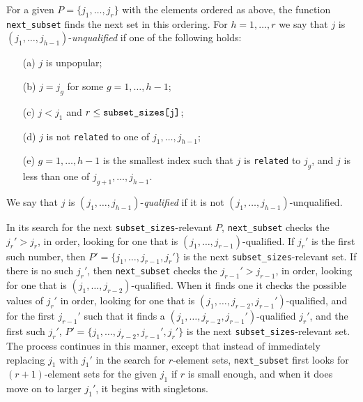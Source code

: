 \documentclass[12pt]{article}
\theoremstyle{definition}
\begin{document}
For a given $P = \{j_1, \ldots, j_r\}$ with the elements ordered as
above, the function \texttt{next\_subset} finds the next set in this
ordering.  For $h = 1, \ldots, r$ we say that $j$ is
$(j_1, \ldots, j_{h-1})$-\emph{unqualified} if one of the following holds:
\begin{enumerate}
  \item[(a)] $j$ is unpopular;
  \item[(b)] $j = j_g$ for some $g = 1, \ldots, h-1$;
  \item[(c)] $j < j_1$ and $r \le \text{\texttt{subset\_sizes[j]}}$;
  \item[(d)] $j$ is not \texttt{related} to one of $j_1, \ldots, j_{h-1}$;
  \item[(e)] $g = 1, \ldots, h-1$ is the smallest index such that $j$
    is \texttt{related} to $j_g$, and $j$ is less than one of $j_{g+1},
    \ldots, j_{h-1}$.
    
\end{enumerate}
We say that $j$ is $(j_1, \ldots, j_{h-1})$-\emph{qualified} if it is not
$(j_1, \ldots, j_{h-1})$-unqualified.

In its search for the next \texttt{subset\_sizes}-relevant $P$,
\texttt{next\_subset} checks the $j_r' > j_r$, in order, looking for
one that is $(j_1, \ldots, j_{r-1})$-qualified.  If $j_r'$ is the
first such number, then $P' = \{j_1, \ldots, j_{r-1},j_r'\}$ is the
next \texttt{subset\_sizes}-relevant set.  If there is no such $j_r'$,
then \texttt{next\_subset} checks the $j_{r-1}' > j_{r-1}$, in order,
looking for one that is $(j_1, \ldots, j_{r-2})$-qualified.  When it
finds one it checks the possible values of $j_r'$ in order, looking
for one that is $(j_1, \ldots, j_{r-2},j_{r-1}')$-qualified, and for
the first $j_{r-1}'$ such that it finds a $(j_1, \ldots,
j_{r-2},j_{r-1}')$-qualified $j_r'$, and the first such $j_r'$, $P' =
\{j_1, \ldots, j_{r-2},j_{r-1}',j_r'\}$ is the next
\texttt{subset\_sizes}-relevant set.  The process continues in this
manner, except that instead of immediately replacing $j_1$ with $j_1'$
in the search for $r$-element sets, \texttt{next\_subset} first looks
for $(r+1)$-element sets for the given $j_1$ if $r$ is small enough,
and when it does move on to larger $j_1'$, it begins with singletons.



\end{document}
